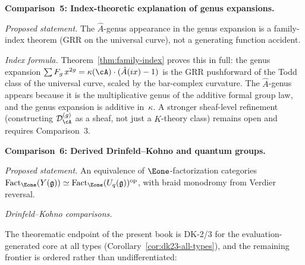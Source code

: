 \medskip

\noindent\textbf{Comparison~5: Index-theoretic explanation of genus
expansions.}

\emph{Proposed statement.}
The $\hat{A}$-genus appearance in the genus expansion is a
family-index theorem (GRR on the universal curve), not a generating
function accident.

\emph{Index formula.}
Theorem~\ref{thm:family-index} proves this in full: the genus
expansion $\sum F_g\, x^{2g} = \kappa(\cA)\cdot(\hat{A}(ix) - 1)$
is the GRR pushforward of the Todd class of the universal curve,
scaled by the bar-complex curvature.  The $\hat{A}$-genus appears
because it is the multiplicative genus of the additive formal
group law, and the genus expansion is additive in~$\kappa$.
A stronger sheaf-level refinement (constructing
$\mathcal{D}_{\cA}^{(g)}$ as a sheaf, not just a $K$-theory
class) remains open and requires Comparison~3.

\medskip

\noindent\textbf{Comparison~6: Derived Drinfeld--Kohno and quantum
groups.}

\emph{Proposed statement.}
An equivalence of $\Eone$-factorization categories
$\operatorname{Fact}_{\Eone}(Y(\mathfrak{g})) \simeq
\operatorname{Fact}_{\Eone}(U_q(\mathfrak{g}))^{\mathrm{op}}$,
with braid monodromy from Verdier reversal.

\emph{Drinfeld--Kohno comparisons.}

The theorematic endpoint of the present book is DK-2/3 for the
evaluation-generated core at all types
(Corollary~\ref{cor:dk23-all-types}), and the remaining
frontier is ordered rather than undifferentiated:

